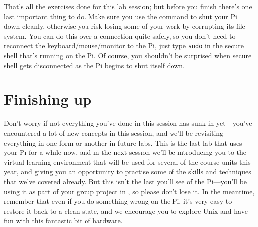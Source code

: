 That's all the exercises done for this lab session; but before you finish  there's one last important thing to do. Make sure you use the  command to shut your Pi down cleanly, otherwise you risk losing some of your work by corrupting its file system. You can do this over a  connection quite safely, so you don't need to reconnect the keyboard/mouse/monitor to the Pi, just type \texttt{sudo}  in the secure shell that's running on the Pi. Of course, you shouldn't be surprised when secure shell gets disconnected as the Pi begins to shut itself down.

\section{Finishing up}
Don't worry if not everything you've done in this session has sunk in yet---you've encountered a lot of new concepts in this session, and we'll be revisiting everything in one form or another in future labs. This is the last lab that uses your Pi for a while now, and in the next session we'll be introducing you to the virtual learning environment that will be used for several of the course units this year, and giving you an opportunity to practise some of the skills and techniques that we've covered already. But this isn't the last you'll see of the Pi---you'll be using it as part of your group project in , so please don't lose it. In the meantime, remember that even if you do something wrong on the Pi, it's very easy to restore it back to a clean state, and we encourage you to explore Unix and have fun with this fantastic bit of hardware.
